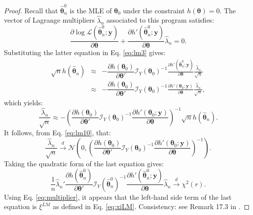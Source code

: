 \documentclass[
  11pt,
]{book}
\theoremstyle{definition}
\theoremstyle{definition}
\theoremstyle{definition}
\theoremstyle{definition}
\theoremstyle{remark}
\begin{document}
\begin{proof}
Recall that \(\hat{\boldsymbol\theta}^0_n\) is the MLE of \(\boldsymbol\theta_0\) under the constraint \(h(\boldsymbol\theta)=0\). The vector of Lagrange multipliers \(\hat\lambda_n\) associated to this program satisfies:
\begin{equation}
\frac{\partial \log \mathcal{L}(\hat{\boldsymbol\theta}^0_n;\mathbf{y})}{\partial \boldsymbol\theta}+ \frac{\partial h'(\hat{\boldsymbol\theta}^0_n;\mathbf{y})}{\partial \boldsymbol\theta}\hat\lambda_n = 0.\label{eq:multiplier}
\end{equation}
Substituting the latter equation in Eq. \eqref{eq:lm3} gives:
\begin{eqnarray*}
\sqrt{n}h(\hat{\boldsymbol\theta}_n) &\approx&
- \dfrac{\partial h(\boldsymbol\theta_0)}{\partial \boldsymbol\theta'} \mathcal{I}_Y(\boldsymbol\theta_0)^{-1}
\frac{\partial h'(\hat{\boldsymbol\theta}^0_n;\mathbf{y})}{\partial \boldsymbol\theta} \frac{\hat\lambda_n}{\sqrt{n}} \\
&\approx&
- \dfrac{\partial h(\boldsymbol\theta_0)}{\partial \boldsymbol\theta'} \mathcal{I}_Y(\boldsymbol\theta_0)^{-1}
\frac{\partial h'(\boldsymbol\theta_0;\mathbf{y})}{\partial \boldsymbol\theta} \frac{\hat\lambda_n}{\sqrt{n}},
\end{eqnarray*}
which yields:
\begin{equation}
\frac{\hat\lambda_n}{\sqrt{n}} \approx - \left(
\dfrac{\partial h(\boldsymbol\theta_0)}{\partial \boldsymbol\theta'} \mathcal{I}_Y(\boldsymbol\theta_0)^{-1}
\frac{\partial h'(\boldsymbol\theta_0;\mathbf{y})}{\partial \boldsymbol\theta}
\right)^{-1}
\sqrt{n}h(\hat{\boldsymbol\theta}_n).\label{eq:lm20}
\end{equation}
It follows, from Eq. \eqref{eq:lm10}, that:
\[
\frac{\hat\lambda_n}{\sqrt{n}} \overset{d}{\rightarrow} \mathcal{N}\left(0,\left(
\dfrac{\partial h(\boldsymbol\theta_0)}{\partial \boldsymbol\theta'} \mathcal{I}_Y(\boldsymbol\theta_0)^{-1}
\frac{\partial h'(\boldsymbol\theta_0;\mathbf{y})}{\partial \boldsymbol\theta}
\right)^{-1}\right).
\]
Taking the quadratic form of the last equation gives:
\[
\frac{1}{n}\hat\lambda_n' \dfrac{\partial h(\hat{\boldsymbol\theta}^0_n)}{\partial \boldsymbol\theta'} \mathcal{I}_Y(\hat{\boldsymbol\theta}^0_n)^{-1}
\frac{\partial h'(\hat{\boldsymbol\theta}^0_n;\mathbf{y})}{\partial \boldsymbol\theta} \hat\lambda_n \overset{d}{\rightarrow} \chi^2(r).
\]
Using Eq. \eqref{eq:multiplier}, it appears that the left-hand side term of the last equation is \(\xi^{LM}\) as defined in Eq. \eqref{eq:xiLM}. Consistency: see Remark 17.3 in \citet{gourieroux_monfort_1995}.
\end{proof}
\end{document}
